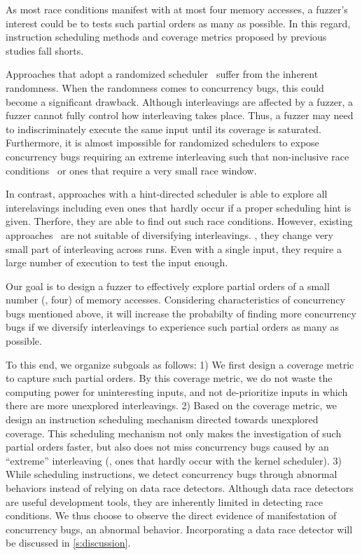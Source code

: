 As most race conditions manifest with at most four memory accesses, a
fuzzer's interest could be to tests such partial orders as many as
possible.
%
In this regard, instruction scheduling methods and coverage metrics
proposed by previous studies fall shorts.


%
Approaches that adopt a randomized scheduler~\cite{krace, ski, muzz}
suffer from the inherent randomness.
%
When the randomness comes to concurrency bugs, this could become a
significant drawback.
%
Although interleavings are affected by a fuzzer, a fuzzer cannot fully
control how interleaving takes place. Thus, a fuzzer may need to
indiscriminately execute the same input until its coverage is
saturated.
%
Furthermore, it is almost impossible for randomized schedulers to
expose concurrency bugs requiring an extreme interleaving such that
non-inclusive race conditions~\cite{exprace} or ones that
require a very small race window.


In contrast, approaches with a hint-directed scheduler is able to
explore all interelavings including even ones that hardly occur if a
proper scheduling hint is given. Therfore, they are able to find out
such race conditions.
%
However, existing approaches~\cite{razzer, snowboard} are not suitable
of diversifying interleavings. \ie, they change very small part of
interleaving across runs.
%
Even with a single input, they require a large number of execution to
test the input enough.


%
Our goal is to design a fuzzer to effectively explore partial orders
of a small number (\eg, four) of memory accesses.
%
Considering characteristics of concurrency bugs mentioned above, it
will increase the probabilty of finding more concurrency bugs if we
diversify interleavings to experience such partial orders as many as
possible.

To this end, we organize subgoals as follows:
%
1) We first design a coverage metric to capture such partial orders.
By this coverage metric, we do not waste the computing power for
uninteresting inputs, and not de-prioritize inputs in which there are
more unexplored interleavings.
%
2) Based on the coverage metric, we design an instruction scheduling
mechanism directed towards unexplored coverage.
%
This scheduling mechanism not only makes the investigation of such
partial orders faster, but also does not miss concurrency bugs caused
by an ``extreme'' interleaving (\ie, ones that hardly occur with the
kernel scheduler).
%
3) While scheduling instructions, we detect concurrency bugs through
abnormal behaviors instead of relying on data race detectors.
%
Although data race detectors are useful development tools, they are
inherently limited in detecting race conditions.
%
We thus choose to observe the direct evidence of manifestation of
concurrency bugs, an abnormal behavior.
%
Incorporating a data race detector will be discussed in
\autoref{s:discussion}.



